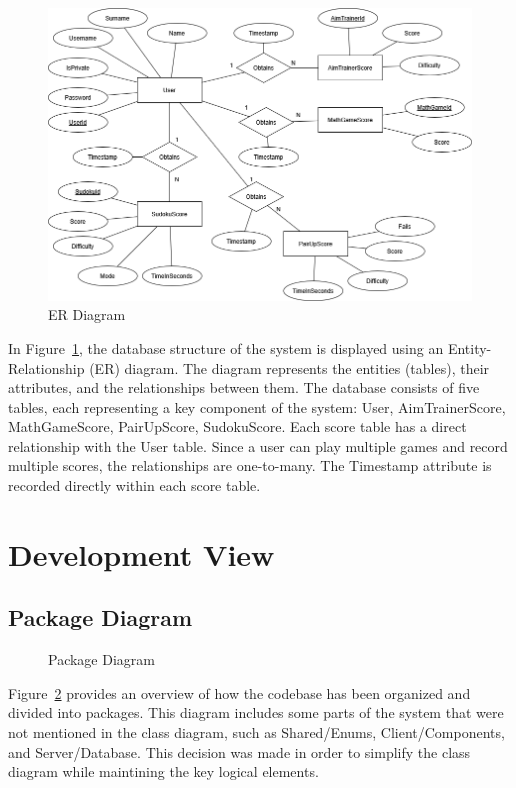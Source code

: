 \documentclass[11pt,a4paper]{article}
\newcommand{\inputdiagram}[1]{}
\newcommand{\textwidthdiagram}[2][1]{%
  \resizebox{#1\textwidth}{!}{\inputdiagram{#2}}%
}
\begin{document}
\begin{figure}[H]
    \centering
    \includegraphics[width=\textwidth]{Diagrams/out/PNG/ER_diagram.png}
    \caption{ER Diagram}
    \label{fig:ER_diagram}
\end{figure}

In Figure~\ref{fig:ER_diagram}, the database structure of the system is displayed using an Entity-Relationship (ER) diagram. The diagram represents the entities (tables), their attributes, and the relationships between them. The database consists of five tables, each representing a key component of the system: User, AimTrainerScore, MathGameScore, PairUpScore, SudokuScore. Each score table has a direct relationship with the User table. Since a user can play multiple games and record multiple scores, the relationships are one-to-many. The Timestamp attribute is recorded directly within each score table.


\section{Development View}

\subsection{Package Diagram}

\begin{figure}[H]
    \centering
    \textwidthdiagram{Package_Diagram.latex}
    \caption{Package Diagram} 
    \label{fig:united_package}
\end{figure}

Figure~\ref{fig:united_package} provides an overview of how the codebase has
been organized and divided into packages. This diagram includes some parts of
the system that were not mentioned in the class diagram, such as Shared/Enums,
Client/Components, and Server/Database. This decision was made in order to
simplify the class diagram while maintining the key logical elements.
\end{document}
